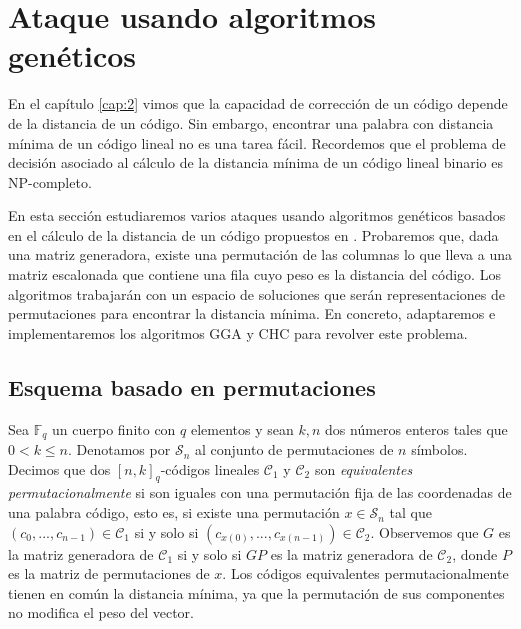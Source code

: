 
\chapter{Ataque usando algoritmos genéticos}

En el capítulo \ref{cap:2} vimos que la capacidad de corrección de un código depende de la distancia de un código. Sin embargo, encontrar una palabra con distancia mínima de un código lineal no es una tarea fácil. Recordemos que el problema de decisión asociado al cálculo de la distancia mínima de un código lineal binario es NP-completo. 

En esta sección estudiaremos varios ataques usando algoritmos genéticos basados en el cálculo de la distancia de un código propuestos en \cite{Cuellar_etal}. Probaremos que, dada una matriz generadora, existe una permutación de las columnas lo que lleva a una matriz escalonada que contiene una fila cuyo peso es la distancia del código. Los algoritmos trabajarán con un espacio de soluciones que serán representaciones de permutaciones para encontrar la distancia mínima. En concreto, adaptaremos e implementaremos los algoritmos GGA y CHC para revolver este problema.

\section{Esquema basado en permutaciones}
\label{sec:perm}

Sea $\mathbb{F}_q$ un cuerpo finito con $q$ elementos y sean $k,n$ dos números enteros tales que $0 < k \leq n$. Denotamos por $\mathcal{S}_n$ al conjunto de permutaciones de $n$ símbolos. Decimos que dos $[n, k]_q$-códigos lineales $\mathcal{C}_1$ y $\mathcal{C}_2$ son \emph{equivalentes permutacionalmente} si son iguales con una permutación fija de las coordenadas de una palabra código, esto es, si existe una permutación $x \in \mathcal{S}_n$ tal que $(c_0, ..., c_{n-1}) \in \mathcal{C}_1$ si y solo si $(c_{x(0)}, ..., c_{x(n-1)}) \in \mathcal{C}_2$. Observemos que $G$ es la matriz generadora de $\mathcal{C}_1$ si y solo si $GP$ es la matriz generadora de $\mathcal{C}_2$, donde $P$ es la matriz de permutaciones de $x$. Los códigos equivalentes permutacionalmente tienen en común la distancia mínima, ya que la permutación de sus componentes no modifica el peso del vector.


